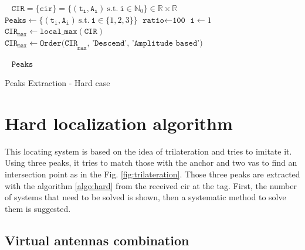 \begin{algorithm}[H]
 \KwInput{}\
 \hspace*{\algorithmicindent} $\mathtt{CIR} = \{\mathtt{cir}\} = \{ (\mathtt{t_i}, \mathtt{A_i}) ~\text{s.t.} ~\mathtt{i} \in \mathbb{N}_0\} \in \mathbb{R} \times \mathbb{R}$ \;
\KwInit{}
\hspace*{\algorithmicindent} $\texttt{Peaks} \longleftarrow \{ (\mathtt{t_i}, \mathtt{A_i}) ~\text{s.t.} ~\mathtt{i} \in \{ 1, 2, 3 \} \}$\;
\hspace*{\algorithmicindent} $\texttt{ratio} \longleftarrow \texttt{100}$\;
\hspace*{\algorithmicindent} $\texttt{i} \longleftarrow 1$\;
\hspace*{\algorithmicindent} $\texttt{CIR}_\texttt{max} \longleftarrow \texttt{local\_max}(\texttt{CIR})$\;
\hspace*{\algorithmicindent} $\texttt{CIR}_\texttt{max} \longleftarrow \texttt{Order(CIR}_\texttt{max}\texttt{, 'Descend', 'Amplitude based')}$\;


 \KwOutput{}\
 \hspace*{\algorithmicindent} $\texttt{Peaks}$\;
 \caption{Peaks Extraction - Hard case \label{algo:hard}}
\end{algorithm}
\vspace{2mm}


\section{Hard localization algorithm}
\label{hard_loc}
This locating system is based on the idea of trilateration and tries to imitate it. Using three peaks, it tries to match those with the anchor and two \glspl{va} to find an intersection point as in the Fig. \ref{fig:trilateration}. Those three peaks are extracted with the algorithm \ref{algo:hard} from the received \gls{cir} at the tag. First, the number of systems that need to be solved is shown, then a systematic method to solve them is suggested.

\subsection{Virtual antennas combination}

